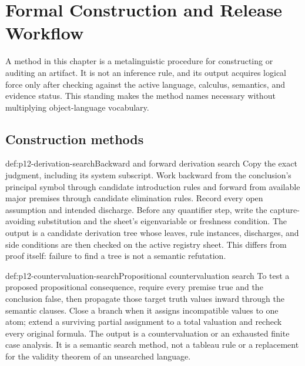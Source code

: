 \chapter{Formal Construction and Release Workflow}
\label{sec:p12-formal-workflow}

A method in this chapter is a metalinguistic procedure for constructing or
auditing an artifact.  It is not an inference rule, and its output acquires
logical force only after checking against the active language, calculus,
semantics, and evidence status.  This standing makes the method names necessary
without multiplying object-language vocabulary.

\section{Construction methods}

\begin{hbmethod}{def:p12-derivation-search}{Backward and forward derivation search}
Copy the exact judgment, including its system subscript.  Work backward from
the conclusion's principal symbol through candidate introduction rules and
forward from available major premises through candidate elimination rules.
Record every open assumption and intended discharge.  Before any quantifier
step, write the capture-avoiding substitution and the sheet's eigenvariable or
freshness condition.  The output is a candidate derivation tree whose leaves,
rule instances, discharges, and side conditions are then checked on the active
registry sheet.  This differs from proof itself: failure to find a tree is not
a semantic refutation.
\end{hbmethod}

\begin{hbmethod}{def:p12-countervaluation-search}{Propositional countervaluation search}
To test a proposed propositional consequence, require every premise true and
the conclusion false, then propagate those target truth values inward through
the semantic clauses.  Close a branch when it assigns incompatible values to
one atom; extend a surviving partial assignment to a total valuation and
recheck every original formula.  The output is a countervaluation or an
exhausted finite case analysis.  It is a semantic search method, not a tableau
rule or a replacement for the validity theorem of an unsearched language.
\end{hbmethod}

